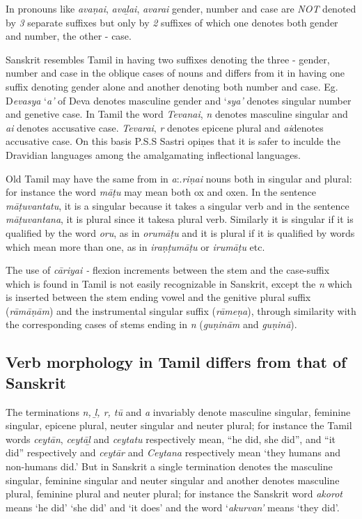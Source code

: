 In pronouns like \textit{avaṇai}, \textit{avaḻai}, \textit{avarai} gender, number and case are \textit{NOT} denoted by \textit{3} separate suffixes but only by\textit{ 2} suffixes of which one denotes both gender and number, the other - case.

Sanskrit resembles Tamil in having two suffixes denoting the three - gender, number and case in the oblique cases of nouns and differs from it in having one suffix denoting gender alone and another denoting both number and case. Eg. D\textit{evasya} ‘\textit{a’} of Deva denotes masculine gender and ‘\textit{sya’} denotes singular number and genetive case. In Tamil the word \textit{Tevanai},\textit{ n} denotes masculine singular and \textit{ai} denotes accusative case. \textit{Tevarai}, \textit{r} denotes epicene plural and \textit{ai}denotes accusative case. On this basis P.S.S Sastri opiṇes that it is safer to inculde the Dravidian languages among the amalgamating inflectional languages.

Old Tamil may have the same from in \textit{a}:.\textit{riṇai} nouns both in singular and plural: for instance the word \textit{māṭu} may mean both ox and oxen. In the sentence \textit{māṭuvantatu}, it is a singular because it takes a singular verb and in the sentence \textit{māṭuvantana}, it is plural since it takesa plural verb. Similarly it is singular if it is qualified by the word \textit{oru}, as in \textit{orumāṭu} and it is plural if it is qualified by words which mean more than one, as in \textit{iraṇṭumāṭu} or \textit{irumāṭu} etc.

The use of \textit{cāriyai -} flexion increments between the stem and the case-suffix which is found in Tamil is not easily recognizable in Sanskrit, except the \textit{n} which is inserted between the stem ending vowel and the genitive plural suffix (\textit{rāmāṇām}) and the instrumental singular suffix (\textit{rāmeṇa}), through similarity with the corresponding cases of stems ending in \textit{n} (\textit{guṇinām} and \textit{guṇinā}).

\subsection*{Verb morphology in Tamil differs from that of Sanskrit}

The terminations \textit{n, ḻ, r, tū} and \textit{a} invariably denote masculine singular, feminine singular, epicene plural, neuter singular and neuter plural; for instance the Tamil words \textit{ceytān}, \textit{ceytāḻ} and \textit{ceytatu} respectively mean, “he did, she did”, and “it did” respectively and \textit{ceytār} and \textit{Ceytana} respectively mean ‘they humans and non-humans did.’ But in Sanskrit a single termination denotes the masculine singular, feminine singular and neuter singular and another denotes masculine plural, feminine plural and neuter plural; for instance the Sanskrit word \textit{akorot} means ‘he did’ ‘she did’ and ‘it does’ and the word ‘\textit{akurvan’} means ‘they did’.

